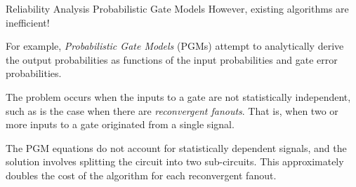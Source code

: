 \documentclass[12pt]{beamer}
\begin{document}
\begin{frame}{Reliability Analysis \small Probabilistic Gate Models}
However, existing algorithms are inefficient!
\vspace{0.25cm}

For example, \emph{Probabilistic Gate Models} (PGMs) attempt to analytically derive the output probabilities as functions of the input probabilities and gate error probabilities. 
\vspace{0.25cm}

The problem occurs when the inputs to a gate are not statistically independent, such as is the case when there are \emph{reconvergent fanouts}. That is, when two or more inputs to a gate originated from a single signal.
\vspace{0.25cm}

The PGM equations do not account for statistically dependent signals, and the solution involves splitting the circuit into two sub-circuits. This approximately doubles the cost of the algorithm for each reconvergent fanout.

\end{frame}
\end{document}
